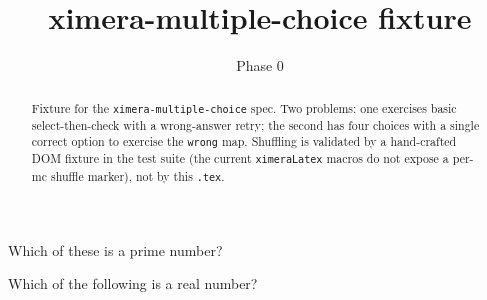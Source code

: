 \documentclass{ximera}
\title{ximera-multiple-choice fixture}
\author{Phase 0}
\begin{document}
\begin{abstract}
Fixture for the \texttt{ximera-multiple-choice} spec. Two problems: one exercises basic select-then-check with a wrong-answer retry; the second has four choices with a single correct option to exercise the \texttt{wrong} map. Shuffling is validated by a hand-crafted DOM fixture in the test suite (the current \texttt{ximeraLatex} macros do not expose a per-mc shuffle marker), not by this \texttt{.tex}.
\end{abstract}

\maketitle

\begin{problem}
  Which of these is a prime number?
  \begin{multipleChoice}
  \end{multipleChoice}
\end{problem}

\begin{problem}
  Which of the following is a real number?
  \begin{multipleChoice}
  \end{multipleChoice}
\end{problem}
\end{document}
